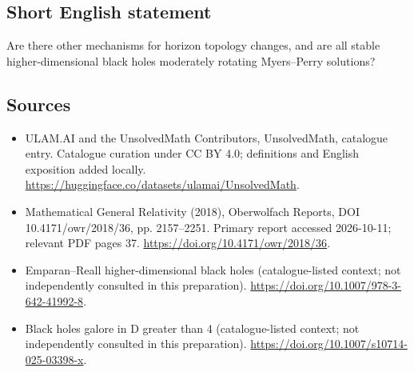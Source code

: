 \documentclass[11pt]{article}
\begin{document}
\subsection{Short English statement}
Are there other mechanisms for horizon topology changes, and are all stable higher-dimensional black holes moderately rotating Myers--Perry solutions?
\subsection{Sources}
\begin{itemize}
\item[\hypertarget{source:statement:1}{S1}] ULAM.AI and the UnsolvedMath Contributors, UnsolvedMath, catalogue entry. Catalogue curation under CC BY 4.0; definitions and English exposition added locally.
\url{https://huggingface.co/datasets/ulamai/UnsolvedMath}.
\item[\hypertarget{source:statement:2}{S2}] Mathematical General Relativity (2018), Oberwolfach Reports, DOI 10.4171/owr/2018/36, pp. 2157--2251. Primary report accessed 2026-10-11; relevant PDF pages 37.
\url{https://doi.org/10.4171/owr/2018/36}.
\item[\hypertarget{source:statement:3}{S3}] Emparan--Reall higher-dimensional black holes (catalogue-listed context; not independently consulted in this preparation).
\url{https://doi.org/10.1007/978-3-642-41992-8}.
\item[\hypertarget{source:statement:4}{S4}] Black holes galore in D greater than 4 (catalogue-listed context; not independently consulted in this preparation).
\url{https://doi.org/10.1007/s10714-025-03398-x}.
\end{itemize}
\label{end:statement}
\end{document}
